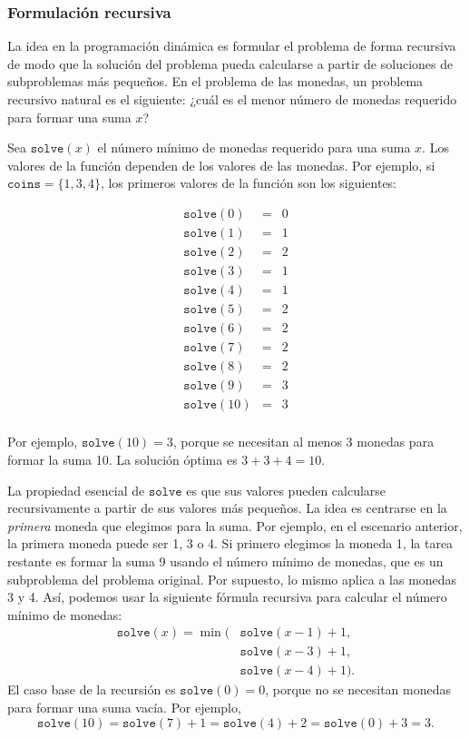 \subsubsection{Formulación recursiva}

La idea en la programación dinámica es
formular el problema de forma recursiva de modo
que la solución del problema pueda
calcularse a partir de soluciones de subproblemas
más pequeños.
En el problema de las monedas, un problema recursivo
natural es el siguiente:
¿cuál es el menor número de monedas
requerido para formar una suma $x$?

Sea $\texttt{solve}(x)$
el número mínimo
de monedas requerido para una suma $x$.
Los valores de la función dependen de los
valores de las monedas.
Por ejemplo, si $\texttt{coins} = \{1,3,4\}$,
los primeros valores de la función son los siguientes:

\[
\begin{array}{lcl}
\texttt{solve}(0) & = & 0 \\
\texttt{solve}(1) & = & 1 \\
\texttt{solve}(2) & = & 2 \\
\texttt{solve}(3) & = & 1 \\
\texttt{solve}(4) & = & 1 \\
\texttt{solve}(5) & = & 2 \\
\texttt{solve}(6) & = & 2 \\
\texttt{solve}(7) & = & 2 \\
\texttt{solve}(8) & = & 2 \\
\texttt{solve}(9) & = & 3 \\
\texttt{solve}(10) & = & 3 \\
\end{array}
\]

Por ejemplo, $\texttt{solve}(10)=3$,
porque se necesitan al menos 3 monedas
para formar la suma 10.
La solución óptima es $3+3+4=10$.

La propiedad esencial de $\texttt{solve}$ es
que sus valores pueden
calcularse recursivamente a partir de sus valores más pequeños.
La idea es centrarse en la \emph{primera}
moneda que elegimos para la suma.
Por ejemplo, en el escenario anterior,
la primera moneda puede ser 1, 3 o 4.
Si primero elegimos la moneda 1,
la tarea restante es formar la suma 9
usando el número mínimo de monedas,
que es un subproblema del problema original.
Por supuesto, lo mismo aplica a las monedas 3 y 4.
Así, podemos usar la siguiente fórmula recursiva
para calcular el número mínimo de monedas:
\begin{equation*}
\begin{split}
\texttt{solve}(x) = \min( & \texttt{solve}(x-1)+1, \\
                           & \texttt{solve}(x-3)+1, \\
                           & \texttt{solve}(x-4)+1).
\end{split}
\end{equation*}
El caso base de la recursión es $\texttt{solve}(0)=0$,
porque no se necesitan monedas para formar una suma vacía.
Por ejemplo,
\[ \texttt{solve}(10) = \texttt{solve}(7)+1 = \texttt{solve}(4)+2 = \texttt{solve}(0)+3 = 3.\]

